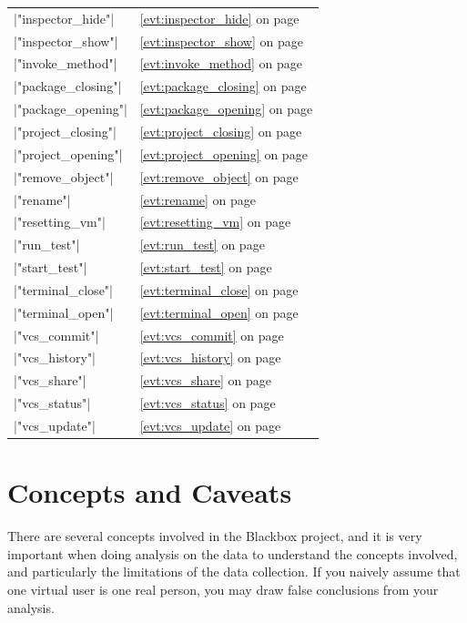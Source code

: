 \documentclass{report}
\newcommand{\myref}[1]{\autoref{#1} on page \pageref*{#1}}
\begin{document}
\begin{table}
\begin{center}
\begin{tabular}{p{6cm}@{}l}
|"inspector_hide"| \dotfill & \myref{evt:inspector_hide}\\
|"inspector_show"| \dotfill & \myref{evt:inspector_show}\\
|"invoke_method"| \dotfill & \myref{evt:invoke_method}\\
|"package_closing"| \dotfill & \myref{evt:package_closing}\\
|"package_opening"| \dotfill & \myref{evt:package_opening}\\
|"project_closing"| \dotfill & \myref{evt:project_closing}\\
|"project_opening"| \dotfill & \myref{evt:project_opening}\\
|"remove_object"| \dotfill & \myref{evt:remove_object}\\
|"rename"| \dotfill & \myref{evt:rename}\\
|"resetting_vm"| \dotfill & \myref{evt:resetting_vm}\\
|"run_test"| \dotfill & \myref{evt:run_test}\\
|"start_test"| \dotfill & \myref{evt:start_test}\\
|"terminal_close"| \dotfill & \myref{evt:terminal_close}\\
|"terminal_open"| \dotfill & \myref{evt:terminal_open}\\
|"vcs_commit"| \dotfill & \myref{evt:vcs_commit}\\
|"vcs_history"| \dotfill & \myref{evt:vcs_history}\\
|"vcs_share"| \dotfill & \myref{evt:vcs_share}\\
|"vcs_status"| \dotfill & \myref{evt:vcs_status}\\
|"vcs_update"| \dotfill & \myref{evt:vcs_update}\\
\end{tabular}
\end{center}
\end{table}

\chapter{Concepts and Caveats}

There are several concepts involved in the Blackbox project, and it is
very important when doing analysis on the data to understand the concepts
involved, and particularly the limitations of the data collection.  If you
naively assume that one virtual user is one real person, you may draw false
conclusions from your analysis.
\end{document}
